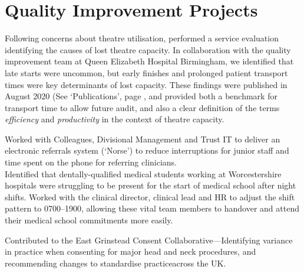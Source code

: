 \section*{Quality Improvement Projects}

 Following concerns about theatre utilisation, performed a service evaluation identifying the causes of lost theatre capacity. In collaboration with the quality improvement team at Queen Elizabeth Hospital Birmingham, we identified that late starts were uncommon, but early finishes and prolonged patient transport times were key determinants of lost capacity. These findings were published in August 2020 (See `Publications', page \pageref{publications}, and provided both a benchmark for transport time to allow future audit, and also a clear definition of the terms \textit{efficiency} and \textit{productivity} in the context of theatre capacity.

 Worked with Colleagues, Divisional Management and Trust IT to deliver an electronic referrals system (`Norse') to reduce interruptions for junior staff and time spent on the phone for referring clinicians.
\\
 Identified that dentally-qualified medical students working at Worcestershire hospitals were struggling to be present for the start of medical school after night shifts. Worked with the clinical director, clinical lead and HR to adjust the shift pattern to 0700--1900, allowing these vital team members to handover and attend their medical school commitments more easily.

 Contributed to the East Grinstead Consent Collaborative---Identifying variance in practice when consenting for major head and neck procedures, and recommending changes to standardise practiceacross the UK.
